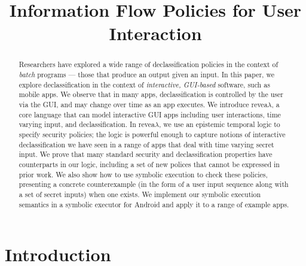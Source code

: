 \documentclass[conference]{IEEEtran}
\theoremstyle{definition}
\begin{document}
\pagestyle{plain}

\title{Information Flow Policies for User Interaction}
\maketitle

\begin{abstract}
  Researchers have explored a wide range of declassification policies
  in the context of \emph{batch} programs --- those that produce an
  output given an input. In this paper, we explore declassification in
  the context of \emph{interactive, GUI-based} software, such as
  mobile apps. We observe that in many apps, declassification is
  controlled by the user via the GUI, and may change over time as an
  app executes. We introduce revea$\lambda$, a core language that can
  model interactive GUI apps including user interactions, time varying
  input, and declassification. In revea$\lambda$, we use an epistemic
  temporal logic to specify security policies; the logic is powerful
  enough to capture notions of interactive declassification we have
  seen in a range of apps that deal with time varying secret input. We
  prove that many standard security and declassification properties
  have counterparts in our logic, including a set of new polices that
  cannot be expressed in prior work.  We also show how to use symbolic
  execution to check these policies, presenting a concrete
  counterexample (in the form of a user input sequence along with a
  set of secret inputs) when one exists.  We implement our symbolic
  execution semantics in a symbolic executor for Android and apply it
  to a range of example apps.
\end{abstract}


\section{Introduction}
\label{sec:introduction}
\end{document}
